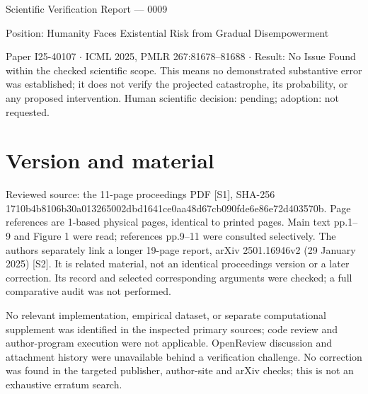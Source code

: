 \documentclass[10pt]{article}
\begin{document}
Scientific Verification Report — 0009\par
Position: Humanity Faces Existential Risk from Gradual Disempowerment\par
Paper I25-40107 \(\cdot\) ICML 2025, PMLR 267:81678–81688 \(\cdot\) Result: No Issue Found within the checked scientific scope. This means no demonstrated substantive error was established; it does not verify the projected catastrophe, its probability, or any proposed intervention. Human scientific decision: pending; adoption: not requested.\par
\section*{Version and material}
Reviewed source: the 11-page proceedings PDF [S1], SHA-256 1710b4b8106b30a013265002dbd1641ce0aa48d67cb090fde6e86e72d403570b. Page references are 1-based physical pages, identical to printed pages. Main text pp.1–9 and Figure 1 were read; references pp.9–11 were consulted selectively. The authors separately link a longer 19-page report, arXiv 2501.16946v2 (29 January 2025) [S2]. It is related material, not an identical proceedings version or a later correction. Its record and selected corresponding arguments were checked; a full comparative audit was not performed.\par
No relevant implementation, empirical dataset, or separate computational supplement was identified in the inspected primary sources; code review and author-program execution were not applicable. OpenReview discussion and attachment history were unavailable behind a verification challenge. No correction was found in the targeted publisher, author-site and arXiv checks; this is not an exhaustive erratum search.\par
\end{document}
